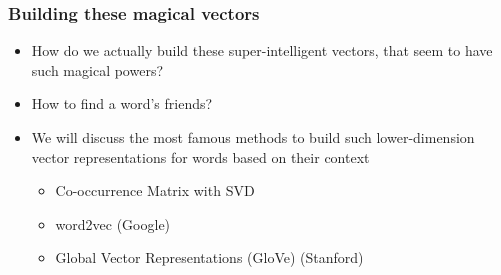 \begin{frame}[fragile]\frametitle{Building these magical vectors }
\begin{itemize}
\item How do we actually build these super-intelligent vectors, that seem to have such magical powers?
\item How to find a word's friends?
\item We will discuss the most famous methods to build such lower-dimension vector representations for words based on their context
\begin{itemize}
\item Co-occurrence Matrix with SVD
\item word2vec  (Google)
\item Global Vector Representations (GloVe)   (Stanford)
\end{itemize}
\end{itemize}
\end{frame}





